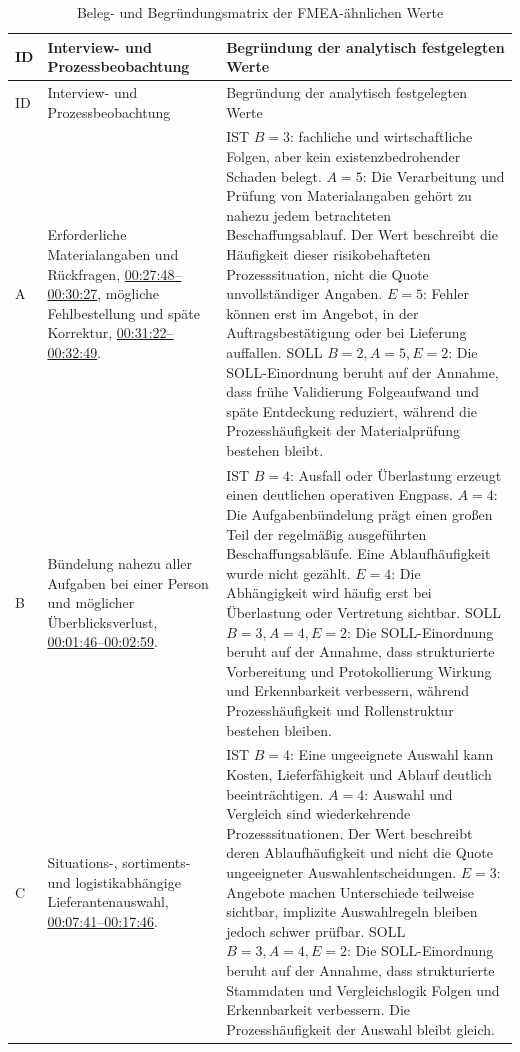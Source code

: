 \documentclass[a4paper,12pt]{article}
\begin{document}
\begin{longtable}{@{}p{}p{}p{}@{}}
    \caption{Beleg- und Begründungsmatrix der FMEA-ähnlichen Werte}
    \label{tab:fmea-begruendung}\\
    \toprule
    ID & Interview- und Prozessbeobachtung & Begründung der analytisch festgelegten Werte \\
    \midrule
    \endfirsthead
    \toprule
    ID & Interview- und Prozessbeobachtung & Begründung der analytisch festgelegten Werte \\
    \midrule
    \endhead
    \bottomrule
    \endfoot
    A & Erforderliche Materialangaben und Rückfragen, \hyperlink{itv:anfragedaten}{00:27:48--00:30:27}, mögliche Fehlbestellung und späte Korrektur, \hyperlink{itv:fehlerstellen}{00:31:22--00:32:49}. & IST \(B=3\): fachliche und wirtschaftliche Folgen, aber kein existenzbedrohender Schaden belegt. \(A=5\): Die Verarbeitung und Prüfung von Materialangaben gehört zu nahezu jedem betrachteten Beschaffungsablauf. Der Wert beschreibt die Häufigkeit dieser risikobehafteten Prozesssituation, nicht die Quote unvollständiger Angaben. \(E=5\): Fehler können erst im Angebot, in der Auftragsbestätigung oder bei Lieferung auffallen. SOLL \(B=2, A=5, E=2\): Die SOLL-Einordnung beruht auf der Annahme, dass frühe Validierung Folgeaufwand und späte Entdeckung reduziert, während die Prozesshäufigkeit der Materialprüfung bestehen bleibt. \\
    \midrule
    B & Bündelung nahezu aller Aufgaben bei einer Person und möglicher Überblicksverlust, \hyperlink{itv:rolle-materialbestellung}{00:01:46--00:02:59}. & IST \(B=4\): Ausfall oder Überlastung erzeugt einen deutlichen operativen Engpass. \(A=4\): Die Aufgabenbündelung prägt einen großen Teil der regelmäßig ausgeführten Beschaffungsabläufe. Eine Ablaufhäufigkeit wurde nicht gezählt. \(E=4\): Die Abhängigkeit wird häufig erst bei Überlastung oder Vertretung sichtbar. SOLL \(B=3, A=4, E=2\): Die SOLL-Einordnung beruht auf der Annahme, dass strukturierte Vorbereitung und Protokollierung Wirkung und Erkennbarkeit verbessern, während Prozesshäufigkeit und Rollenstruktur bestehen bleiben. \\
    \midrule
    C & Situations-, sortiments- und logistikabhängige Lieferantenauswahl, \hyperlink{itv:lieferanten-angebote}{00:07:41--00:17:46}. & IST \(B=4\): Eine ungeeignete Auswahl kann Kosten, Lieferfähigkeit und Ablauf deutlich beeinträchtigen. \(A=4\): Auswahl und Vergleich sind wiederkehrende Prozesssituationen. Der Wert beschreibt deren Ablaufhäufigkeit und nicht die Quote ungeeigneter Auswahlentscheidungen. \(E=3\): Angebote machen Unterschiede teilweise sichtbar, implizite Auswahlregeln bleiben jedoch schwer prüfbar. SOLL \(B=3, A=4, E=2\): Die SOLL-Einordnung beruht auf der Annahme, dass strukturierte Stammdaten und Vergleichslogik Folgen und Erkennbarkeit verbessern. Die Prozesshäufigkeit der Auswahl bleibt gleich. \\

\end{longtable}
\end{document}
